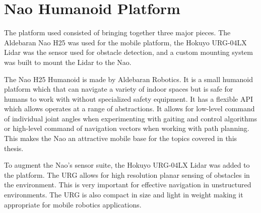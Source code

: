 \chapter{Nao Humanoid Platform}\label{ch:platform}

The platform used consisted of bringing together three major pieces.
The Aldebaran Nao H25 was used for the mobile platform, the Hokuyo URG-04LX
Lidar was the sensor used for obstacle detection, and a custom mounting system
was built to mount the Lidar to the Nao.

The Nao H25 Humanoid is made by Aldebaran Robotics. It is a small humanoid platform
which that can navigate a variety of indoor spaces but is safe for humans to 
work with without specialized safety equipment. It has a flexible API which allows
operates at a range of abstractions. It allows for low-level command of individual
joint angles when experimenting with gaiting and control algorithms or high-level
command of navigation vectors when working with path planning.
This makes the Nao an attractive mobile base for the topics covered in this thesis.

To augment the Nao's sensor suite, the Hokuyo URG-04LX Lidar was added to the platform.
The URG allows for high resolution planar sensing of obstacles in the environment.
This is very important for effective navigation in unstructured environments.
The URG is also compact in size and light in weight making it appropriate
for mobile robotics applications.

